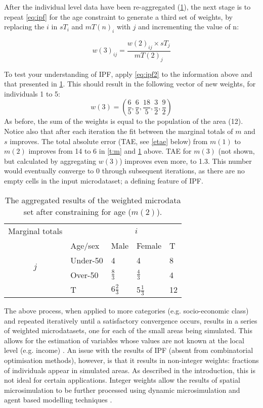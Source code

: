 After the individual level data have been re-aggregated (\cref{t:m2}),
the next stage is to repeat \cref{eq:ipf} for the age constraint to generate a
third set of weights, by replacing
the $i$ in $sT_{i}$ and $mT(n)_{i}$ with $j$ and incrementing the value of n:

\begin{equation}
w(3)_{ij} = \frac{w(2)_{ij} \times sT_{j}}{mT(2)_{j}}
\label{eq:ipf2}
\end{equation}

To test your understanding of IPF, apply \cref{eq:ipf2} to the information above
and that presented in \cref{t:m2}.
This should result in the following vector of new weights, for individuals 1 to 5:
\begin{equation}
  w(3) = (\frac{6}{5}, \frac{6}{5}, \frac{18}{5}, \frac{3}{2}, \frac{9}{2})
\end{equation}
As before, the sum of the weights is equal to the population of the area (12).
Notice also that after each iteration the fit between the marginal
totals of $m$ and $s$
improves. The total absolute error (TAE, see \cref{etae} below)
from $m(1)$ to $m(2)$ improves from
14 to 6 in \cref{t:m} and \cref{t:m2} above. TAE for $m(3)$ (not shown,
but calculated by aggregating $w(3)$) improves even more, to 1.3.
This number would eventually converge to 0 through subsequent
iterations, as there are no empty cells in the input microdataset;
a defining feature of IPF.


\begin{table}[htbp]
\centering
\caption[Aggregated results after constraining for age]{The
aggregated results of the weighted
microdata set after constraining for age ($m(2)$).
}

\begin{tabular}{cllll}\toprule
Marginal totals&  & \multicolumn{2}{c}{$i$} & \\
& Age/sex & Male & Female & T\\ \midrule
\multirow{2}{*}{$j$} & Under-50 & 4 & 4 & 8\\
& Over-50 & $\frac{8}{3}$ & $\frac{4}{3}$ & 4 \\
& T & $6\frac{2}{3}$ & 5$\frac{1}{3}$ & 12\\
\bottomrule
\end{tabular}
\label{t:m2}
\end{table}

The above process, when applied to more categories (e.g. socio-economic class)
and repeated iteratively until a satisfactory convergence occurs, results in a
series of weighted microdatasets, one for each of the small areas being
simulated. This allows for the estimation of variables whose values are not
known at the local level (e.g. income) \citep{Ballas2005}. An issue
with the results of IPF (absent from combinatorial optimisation methods),
however, is that it results in non-integer weights: fractions of individuals
appear in simulated areas. As described in the introduction, this is not ideal
for certain applications. Integer weights allow the results of spatial
microsimulation to be further processed using dynamic microsimulation and agent
based modelling techniques \citep{Pritchard2012}.


